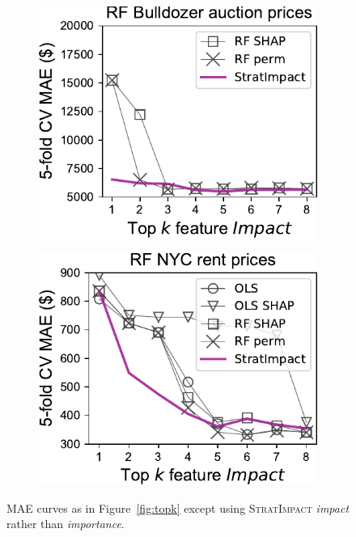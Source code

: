 \documentclass[11pt]{article}
\newcommand{\figref}[1]{Figure~\ref{#1}}
\newcommand{\todo}[1]{{{\small\color{red}{[#1]}}}}
\newcommand{\simp}{\fontfamily{cmr}\textsc{\small StratImpact}}
\begin{document}
\begin{figure}
\begin{subfigure}{.245\textwidth}
\includegraphics[scale=0.45]{images/bulldozer-topk-RF-Impact.pdf}
\subcaption{}
\end{subfigure}%
\hfill
\begin{subfigure}{.245\textwidth}
    \centering
\includegraphics[scale=0.45]{images/rent-topk-RF-Impact.pdf}
\subcaption{}
\end{subfigure}
\caption[short]{\small MAE curves as in \figref{fig:topk} except using \simp{} {\em impact} rather than {\em importance}. \todo{Note OLS beats for 1st feature!}}
\label{fig:topk-impact}
\end{figure}
\end{document}
